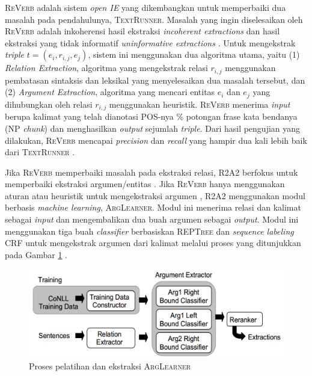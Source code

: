\textsc{ReVerb} adalah sistem \textit{open IE} yang dikembangkan untuk memperbaiki dua masalah pada pendahulunya, \textsc{TextRunner}. Masalah yang ingin diselesaikan oleh \textsc{ReVerb} adalah inkoherensi hasil ekstraksi \textit{incoherent extractions} dan hasil ekstraksi yang tidak informatif \textit{uninformative extractions} \citep{fader2011identifying}. Untuk mengekstrak \textit{triple} $t = (e_i, r_{i,j}, e_j)$, sistem ini menggunakan dua algoritma utama, yaitu (1) \textit{Relation Extraction}, algoritma yang mengekstrak relasi $r_{i,j}$ menggunakan pembatasan sintaksis dan leksikal yang menyelesaikan dua masalah tersebut, dan (2) \textit{Argument Extraction}, algoritma yang mencari entitas $e_i$ dan $e_j$ yang dihubungkan oleh relasi $r_{i,j}$ menggunakan heuristik.  \textsc{ReVerb} menerima \textit{input} berupa kalimat yang telah dianotasi POS-nya \% potongan frase kata bendanya (NP \textit{chunk}) dan menghasilkan \textit{output} sejumlah \textit{triple}. Dari hasil pengujian yang dilakukan, \textsc{ReVerb} mencapai \textit{precision} dan \textit{recall} yang hampir dua kali lebih baik dari \textsc{TextRunner} \citep{fader2011identifying}.

Jika \textsc{ReVerb} memperbaiki masalah pada ekstraksi relasi, \textsc{R2A2} berfokus untuk memperbaiki ekstraksi argumen/entitas \citep{etzioni2011open}. Jika \textsc{ReVerb} hanya menggunakan aturan atau heuristik untuk mengekstraksi argumen \citep{fader2011identifying}, \textsc{R2A2} menggunakan modul berbasis \textit{machine learning}, \textsc{ArgLearner}. Modul ini menerima relasi dan kalimat sebagai \textit{input} dan mengembalikan dua buah argumen sebagai \textit{output}. Modul ini menggunakan tiga buah \textit{classifier} berbasiskan \textsc{REPTree} \citep{hall2009weka} dan \textit{sequence labeling} CRF \citep{mccallum2002mallet} untuk mengekstrak argumen dari kalimat melalui proses yang ditunjukkan pada Gambar \ref{fig_arglearner_architecture} \citep{etzioni2011open}.

\begin{figure}
\centering
\includegraphics[scale=0.5]{../images/arglearner_architecture.png}
\caption{Proses pelatihan dan ekstraksi \textsc{ArgLearner}}
\label{fig_arglearner_architecture}
\end{figure}

